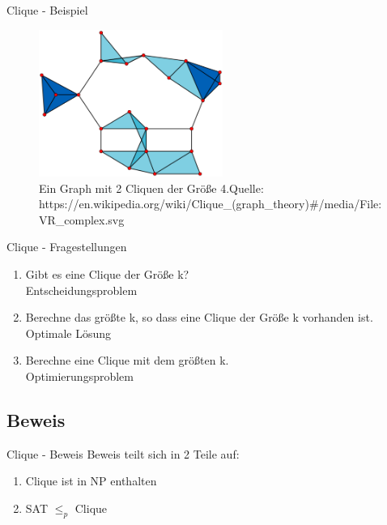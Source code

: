 \documentclass[12pt,handout,notes=dontshow,xcolor=table]{beamer}
\begin{document}
\begin{frame}{Clique - Beispiel}
\begin{figure}
\includegraphics[width=6cm]{figures/clique2.png}
\caption{Ein Graph mit 2 Cliquen der Größe 4.\newline \newline \tiny Quelle: https://en.wikipedia.org/wiki/Clique\_(graph\_theory)\#/media/File:VR\_complex.svg}
\end{figure}
\end{frame}

\begin{frame}{Clique - Fragestellungen}
\begin{enumerate}
\item Gibt es eine Clique der Größe k?\\
\textrightarrow Entscheidungsproblem
\newline \pause
\item Berechne das größte k, so dass eine Clique der Größe k vorhanden ist.\\
\textrightarrow Optimale Lösung
\newline \pause
\item Berechne eine Clique mit dem größten k.\\
\textrightarrow Optimierungsproblem
\end{enumerate}
\end{frame}

\subsection{Beweis}
\begin{frame}{Clique - Beweis}
Beweis teilt sich in 2 Teile auf:
\begin{enumerate}
\item Clique ist in NP enthalten
\item SAT $\le_p$ Clique
\end{enumerate}
\end{frame}
\end{document}
